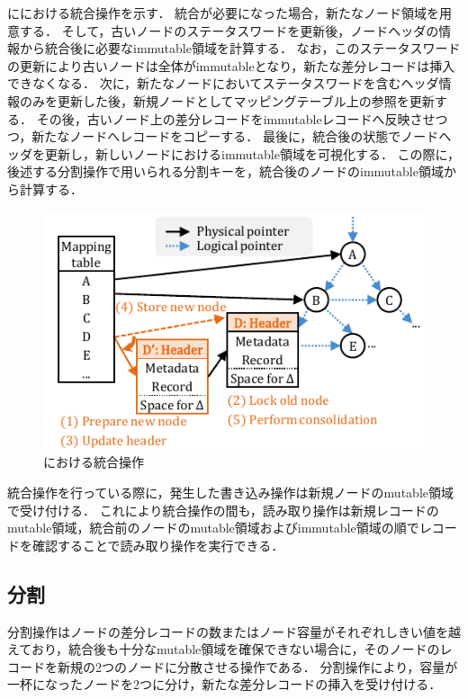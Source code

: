 \Fig{\ref{fig:bc_tree_consolidastion}}に\Bctree{}における統合操作を示す．
統合が必要になった場合，新たなノード領域を用意する．
そして，古いノードのステータスワードを更新後，ノードヘッダの情報から統合後に必要なimmutable領域を計算する．
なお，このステータスワードの更新により古いノードは全体がimmutableとなり，新たな差分レコードは挿入できなくなる．
次に，新たなノードにおいてステータスワードを含むヘッダ情報のみを更新した後，新規ノードとしてマッピングテーブル上の参照を更新する．
その後，古いノード上の差分レコードをimmutableレコードへ反映させつつ，新たなノードへレコードをコピーする．
最後に，統合後の状態でノードヘッダを更新し，新しいノードにおけるimmutable領域を可視化する．
この際に，後述する分割操作で用いられる分割キーを，統合後のノードのimmutable領域から計算する．

\begin{figure}[t]
    \centering
    \includegraphics{./figures/Bc-consolidate.pdf}
    \caption{\Bctree{}における統合操作}
    \label{fig:bc_tree_consolidastion}
\end{figure}

統合操作を行っている際に，発生した書き込み操作は新規ノードのmutable領域で受け付ける．
これにより統合操作の間も，読み取り操作は新規レコードのmutable領域，統合前のノードのmutable領域およびimmutable領域の順でレコードを確認することで読み取り操作を実行できる．

\subsection{分割}

分割操作はノードの差分レコードの数またはノード容量がそれぞれしきい値を越えており，統合後も十分なmutable領域を確保できない場合に，そのノードのレコードを新規の2つのノードに分散させる操作である．
分割操作により，容量が一杯になったノードを2つに分け，新たな差分レコードの挿入を受け付ける．

